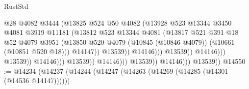 \begin{lexlean}{RustStd}
\begin{coremodule}
                                                      @28
                                                      @4082
                                                      @3444
                                                      (@13825
                                                        @524
                                                        @50
                                                        @4082
                                                        (@13928
                                                          @523
                                                          @13344
                                                          @3450
                                                          @4081
                                                          @3919
                                                          @11181
                                                          (@13812
                                                            @523
                                                            @13344
                                                            @4081
                                                            (@13817
                                                              @521
                                                              @391
                                                              @18
                                                              @52
                                                              @4079
                                                              @3951
                                                              (@13850
                                                                @520
                                                                @4079
                                                                (@10845 (@10846 @4079))
                                                                (@10661 (@10851 @520 @18)))
                                                              @14147))
                                                          @13539))
                                                      @14146)))
                                                @13539))
                                            @14146)))
                                      @13539))
                                  @14146)))
                            @13539))
                        @14146)))
                  @13539))
              @14146)))
        @13539))
@14550 := @14234
    (@14237
      (@14244
        (@14247 (@14263 (@14269 (@14285 (@14301 (@14536 @14147))))))

\end{coremodule}
\end{lexlean}
